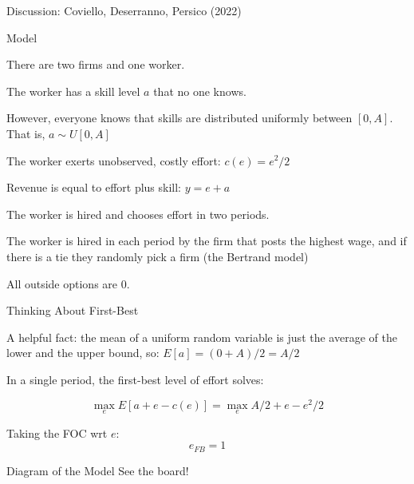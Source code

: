 \documentclass[aspectratio=169,usenames,dvipsnames]{beamer}
\newenvironment{wideitemize}{\itemize\addtolength{\itemsep}{10pt}}{\enditemize}
\begin{document}
\begin{frame}
\centering
    \huge Discussion: Coviello, Deserranno, Persico (2022)

\end{frame}



\begin{frame}{Model}
    \begin{wideitemize}
        \item There are two firms and one worker.
        \item The worker has a skill level $a$ that no one knows.
        \item However, everyone knows that skills are distributed uniformly between $[0,A]$. That is, $a\sim U[0,A]$
        \item The worker exerts unobserved, costly effort: $c(e)=e^2/2$
        \item Revenue is equal to effort plus skill: $y=e+a$
        \item The worker is hired and chooses effort in two periods.
        \item The worker is hired in each period by the firm that posts the highest wage, and if there is a tie they randomly pick a firm (the Bertrand model)
        \item All outside options are 0.
    \end{wideitemize}
\end{frame}

\begin{frame}{Thinking About First-Best}

\begin{wideitemize}
    \item A helpful fact: the mean of a uniform random variable is just the average of the lower and the upper bound, so: $E[a]=(0+A)/2=A/2$\pause
    \item In a single period, the first-best level of effort solves:

    \[\max_{e} E[a+e -c(e)] =  \max_{e} A/2+e-e^2/2  \]
    \pause
    \item Taking the FOC wrt $e$:
    \[e_{FB}= 1\]
    
\end{wideitemize}
    
\end{frame}

\begin{frame}{Diagram of the Model}
\centering
    \huge See the board!

\end{frame}
\end{document}
